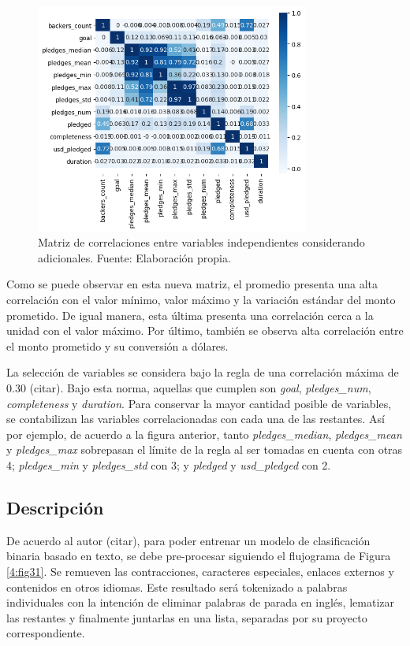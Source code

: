 \begin{figure}[!ht]
	\begin{center}
		\includegraphics[width=0.8\textwidth]{4/figures/metadata correlation v2.png}
		\caption{Matriz de correlaciones entre variables independientes considerando adicionales. Fuente: Elaboración propia.}
		\label{4:fig30}
	\end{center}
\end{figure}

Como se puede observar en esta nueva matriz, el promedio presenta una alta correlación con el valor mínimo, valor máximo y la variación estándar del monto prometido. De igual manera, esta última presenta una correlación cerca a la unidad con el valor máximo. Por último, también se observa alta correlación entre el monto prometido y su conversión a dólares.

La selección de variables se considera bajo la regla de una correlación máxima de 0.30 (citar). Bajo esta norma, aquellas que cumplen son \textit{goal}, \textit{pledges\_num}, \textit{completeness} y \textit{duration}. Para conservar la mayor cantidad posible de variables, se contabilizan las variables correlacionadas con cada una de las restantes. Así por ejemplo, de acuerdo a la figura anterior, tanto \textit{pledges\_median}, \textit{pledges\_mean} y \textit{pledges\_max} sobrepasan el límite de la regla al ser tomadas en cuenta con otras 4; \textit{pledges\_min} y \textit{pledges\_std} con 3; y \textit{pledged} y \textit{usd\_pledged} con 2.

\subsection{Descripción}
De acuerdo al autor (citar), para poder entrenar un modelo de clasificación binaria basado en texto, se debe pre-procesar siguiendo el flujograma de Figura \ref{4:fig31}. Se remueven las contracciones, caracteres especiales, enlaces externos y contenidos en otros idiomas. Este resultado será tokenizado a palabras individuales con la intención de eliminar palabras de parada en inglés, lematizar las restantes y finalmente juntarlas en una lista, separadas por su proyecto correspondiente.

